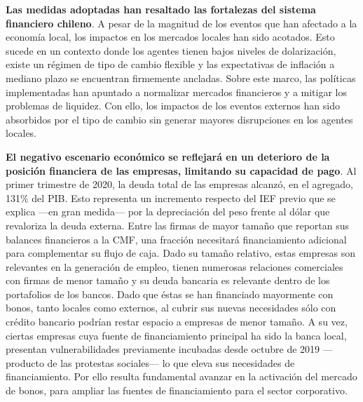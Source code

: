 \documentclass[
]{book}
\begin{document}
\textbf{Las medidas adoptadas han resaltado las fortalezas del sistema financiero chileno}. A pesar de la magnitud de los eventos que han afectado a
la economía local, los impactos en los mercados locales han sido acotados. Esto
sucede en un contexto donde los agentes tienen bajos niveles de dolarización,
existe un régimen de tipo de cambio flexible y las expectativas de inflación
a mediano plazo se encuentran firmemente ancladas. Sobre este marco, las
políticas implementadas han apuntado a normalizar mercados financieros y a
mitigar los problemas de liquidez. Con ello, los impactos de los eventos externos
han sido absorbidos por el tipo de cambio sin generar mayores disrupciones en
los agentes locales.

\textbf{El negativo escenario económico se reflejará en un deterioro de la posición financiera de las empresas, limitando su capacidad de pago}. Al primer trimestre de 2020, la deuda total de las empresas alcanzó,
en el agregado, 131\% del PIB. Esto representa un incremento respecto del
IEF previo que se explica ---en gran medida--- por la depreciación del peso
frente al dólar que revaloriza la deuda externa. Entre las firmas de mayor
tamaño que reportan sus balances financieros a la CMF, una fracción necesitará
financiamiento adicional para complementar su flujo de caja. Dado su tamaño
relativo, estas empresas son relevantes en la generación de empleo, tienen
numerosas relaciones comerciales con firmas de menor tamaño y su deuda
bancaria es relevante dentro de los portafolios de los bancos. Dado que éstas
se han financiado mayormente con bonos, tanto locales como externos, al
cubrir sus nuevas necesidades sólo con crédito bancario podrían restar espacio
a empresas de menor tamaño. A su vez, ciertas empresas cuya fuente de
financiamiento principal ha sido la banca local, presentan vulnerabilidades
previamente incubadas desde octubre de 2019 ---producto de las protestas
sociales--- lo que eleva sus necesidades de financiamiento. Por ello resulta
fundamental avanzar en la activación del mercado de bonos, para ampliar las
fuentes de financiamiento para el sector corporativo.
\end{document}
